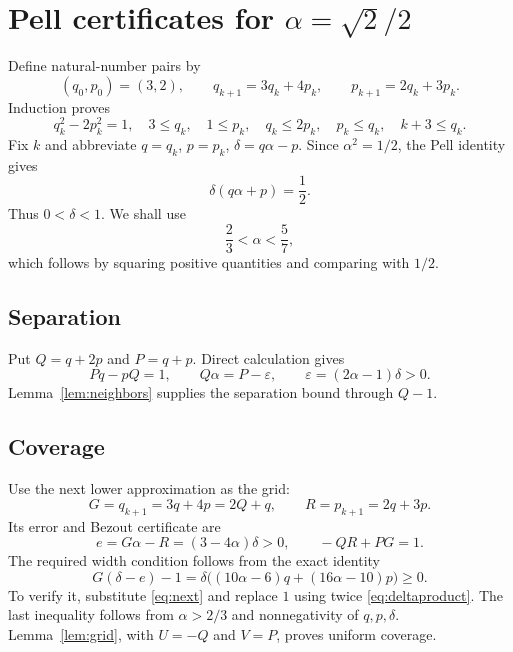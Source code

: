 \documentclass[11pt]{article}
\theoremstyle{remark}
\begin{document}
\section{Pell certificates for $\alpha=\sqrt2/2$}
Define natural-number pairs by
\begin{equation}\label{eq:pellrec}
(q_0,p_0)=(3,2),\qquad
q_{k+1}=3q_k+4p_k,\qquad p_{k+1}=2q_k+3p_k.
\end{equation}
Induction proves
\begin{equation}\label{eq:pell}
q_k^2-2p_k^2=1,\quad 3\le q_k,\quad 1\le p_k,\quad
q_k\le2p_k,\quad p_k\le q_k,\quad k+3\le q_k.
\end{equation}
Fix $k$ and abbreviate $q=q_k$, $p=p_k$, $\delta=q\alpha-p$.
Since $\alpha^2=1/2$, the Pell identity gives
\begin{equation}\label{eq:deltaproduct}
\delta(q\alpha+p)=\frac12.
\end{equation}
Thus $0<\delta<1$. We shall use
\[
\frac23<\alpha<\frac57,
\]
which follows by squaring positive quantities and comparing with $1/2$.

\subsection{Separation}
Put $Q=q+2p$ and $P=q+p$. Direct calculation gives
\[
Pq-pQ=1,\qquad Q\alpha=P-\varepsilon,
\qquad \varepsilon=(2\alpha-1)\delta>0.
\]
Lemma~\ref{lem:neighbors} supplies the separation bound through $Q-1$.

\subsection{Coverage}
Use the next lower approximation as the grid:
\[
G=q_{k+1}=3q+4p=2Q+q,\qquad R=p_{k+1}=2q+3p.
\]
Its error and Bezout certificate are
\begin{equation}\label{eq:next}
e=G\alpha-R=(3-4\alpha)\delta>0,
\qquad -QR+PG=1.
\end{equation}
The required width condition follows from the exact identity
\begin{equation}\label{eq:width}
G(\delta-e)-1
=\delta\bigl((10\alpha-6)q+(16\alpha-10)p\bigr)\ge0.
\end{equation}
To verify it, substitute \eqref{eq:next} and replace $1$ using twice
\eqref{eq:deltaproduct}. The last inequality follows from
$\alpha>2/3$ and nonnegativity of $q,p,\delta$.
Lemma~\ref{lem:grid}, with $U=-Q$ and $V=P$, proves uniform coverage.
\end{document}
